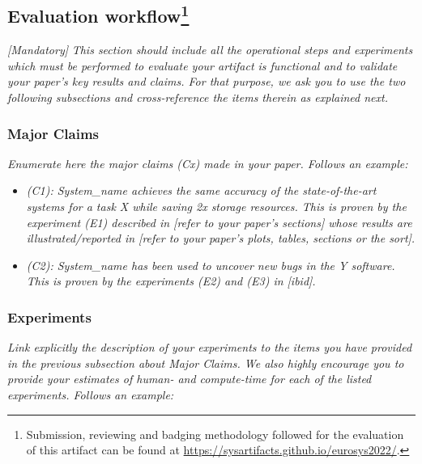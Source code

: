 \subsection{Evaluation workflow\footnote{
Submission, reviewing and badging methodology followed for the evaluation of this artifact can be found at \url{https://sysartifacts.github.io/eurosys2022/}.}}
{\em [Mandatory]} \textit{This section should include all the operational steps and experiments which must be performed to evaluate your artifact is functional and to validate your paper's key results and claims. For that purpose, we ask you to use the two following subsections and cross-reference the items therein as explained next.}

\subsubsection{Major Claims}
\textit{Enumerate here the major claims (Cx) made in your paper. Follows an example:}\\

\begin{itemize}
    \item \textit{(C1): System\_name achieves the same accuracy of the state-of-the-art systems for a task X while saving 2x storage resources. This is proven by the experiment (E1) described in [refer to your paper's sections] whose results are illustrated/reported in [refer to your paper's plots, tables, sections or the sort].}
    \item \textit{(C2): System\_name has been used to uncover new bugs in the Y software. This is proven by the experiments (E2) and (E3) in [ibid].}
\end{itemize}

\subsubsection{Experiments}
\textit{Link explicitly the description of your experiments to the items you have provided in the previous subsection about Major Claims. We also highly encourage you to provide your estimates of human- and compute-time for each of the listed experiments. Follows an example:}
~\\

